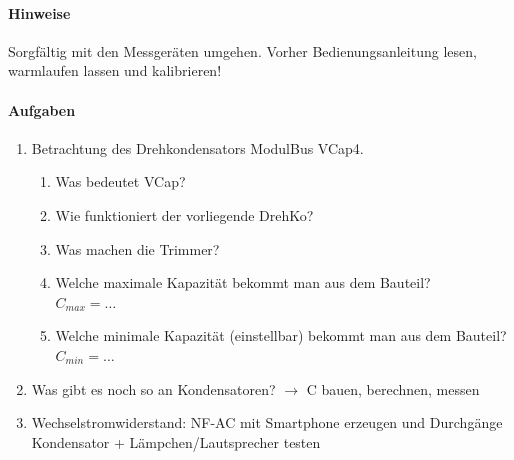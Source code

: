 \paragraph{Hinweise}

Sorgfältig mit den Messgeräten umgehen. Vorher Bedienungsanleitung lesen,
warmlaufen lassen und kalibrieren!

\paragraph{Aufgaben}

\begin{enumerate}
    \item Betrachtung des Drehkondensators ModulBus VCap4.
    \begin{enumerate}
      \item Was bedeutet VCap?\\
      \item Wie funktioniert der vorliegende DrehKo?\\
      \item Was machen die Trimmer?\\
        \loesung{}
      \item Welche maximale Kapazität bekommt man aus dem Bauteil?\\
        $C_{max} = \dots$ \loesung{}
      \item Welche minimale Kapazität (einstellbar) bekommt man aus dem
        Bauteil?\\
        $C_{min} = \dots$ \loesung{}
    \end{enumerate}
  \item Was gibt es noch so an Kondensatoren? $\rightarrow$ C bauen, berechnen, messen
  \item Wechselstromwiderstand: NF-AC mit Smartphone erzeugen und Durchgänge
    Kondensator + Lämpchen/Lautsprecher testen
\end{enumerate}
